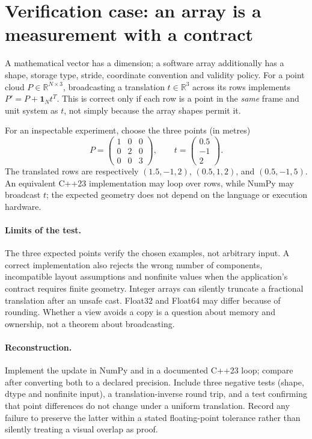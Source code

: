 \clearpage
\section*{Verification case: an array is a measurement with a contract}
\noindent A mathematical vector has a dimension; a software array additionally has
a shape, storage type, stride, coordinate convention and validity policy.
For a point cloud \(P\in\mathbb R^{N\times 3}\), broadcasting a translation
\(t\in\mathbb R^3\) across its rows implements \(P'=P+\mathbf1_Nt^T\).
This is correct only if each row is a point in the \emph{same}
frame and unit system as \(t\), not simply because the array shapes permit it.

For an inspectable experiment, choose the three points (in metres)
\[
P=\begin{pmatrix}1&0&0\\0&2&0\\0&0&3\end{pmatrix},
\qquad t=\begin{pmatrix}0.5\\-1\\2\end{pmatrix}.
\]
The translated rows are respectively
\((1.5,-1,2)\), \((0.5,1,2)\), and \((0.5,-1,5)\).
An equivalent C++23 implementation may loop over rows, while NumPy
may broadcast \(t\); the expected geometry does not depend on the
language or execution hardware.

\paragraph{Limits of the test.}
The three expected points verify the chosen examples, not arbitrary
input. A correct implementation also rejects the wrong number of
components, incompatible layout assumptions and nonfinite values
when the application's contract requires finite geometry.
Integer arrays can silently truncate a fractional translation after an
unsafe cast. Float32 and Float64 may differ because of rounding.
Whether a view avoids a copy is a question about memory and ownership,
not a theorem about broadcasting.

\paragraph{Reconstruction.}
Implement the update in NumPy and in a documented C++23 loop;
compare after converting both to a declared precision. Include
three negative tests (shape, dtype and nonfinite input), a
translation-inverse round trip, and a test confirming that point
differences do not change under a uniform translation. Record any
failure to preserve the latter within a stated floating-point
tolerance rather than silently treating a visual overlap as proof.
